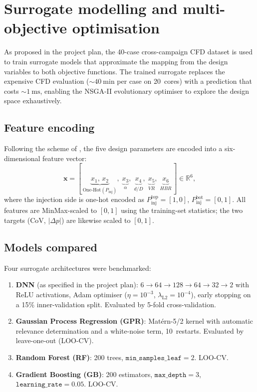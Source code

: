 \documentclass[11pt,a4paper]{article}
\def\VR{VR}%
\def\HBR{HBR}%
\def\CoV{CoV}%
\newcommand{\VR}{\ensuremath{\mathrm{VR}}}
\newcommand{\HBR}{\ensuremath{\mathrm{HBR}}}
\newcommand{\CoV}{\ensuremath{\mathrm{CoV}}}
\begin{document}
\section{Surrogate modelling and multi-objective optimisation}
\label{sec:surrogate}

As proposed in the project plan, the 40-case cross-campaign CFD
dataset is used to train surrogate models that approximate the
mapping from the design variables to both objective functions.
The trained surrogate replaces the expensive CFD evaluation
(\(\sim\SI{40}{\minute}\) per case on 20~cores) with a prediction
that costs \(\sim\SI{1}{\milli\second}\), enabling the NSGA-II
evolutionary optimiser to explore the design space
exhaustively.

\subsection{Feature encoding}
\label{sec:surr_encoding}
Following the scheme of \citet{Su2022}, the five design
parameters are encoded into a six-dimensional feature vector:
\[
   \mathbf{x}
   = [\,\underbrace{x_1,\, x_2}_{\text{One-Hot}(P_{\mathrm{inj}})},\;
      \underbrace{x_3}_{\alpha},\;
      \underbrace{x_4}_{d/D},\;
      \underbrace{x_5}_{\VR},\;
      \underbrace{x_6}_{\HBR}\,]
   \in \mathbb{R}^{6},
\]
where the injection side is one-hot encoded as
\(P_{\mathrm{inj}}^{\text{top}}=[1,0]\),
\(P_{\mathrm{inj}}^{\text{bot}}=[0,1]\).
All features are MinMax-scaled to \([0,1]\) using the training-set
statistics; the two targets (\CoV, \(|\Delta p|\)) are likewise
scaled to \([0,1]\).

\subsection{Models compared}
Four surrogate architectures were benchmarked:
\begin{enumerate}
   \item \textbf{DNN} (as specified in the project plan):
         \(6\!\to\!64\!\to\!128\!\to\!64\!\to\!32\!\to\!2\) with
         ReLU activations, Adam optimiser
         (\(\eta=10^{-3}\), \(\lambda_{\mathrm{L2}}=10^{-4}\)),
         early stopping on a 15\% inner-validation split.
         Evaluated by 5-fold cross-validation.
   \item \textbf{Gaussian Process Regression (GPR)}: Mat\'ern-5/2
         kernel with automatic relevance determination and a white-noise
         term, 10~restarts.  Evaluated by leave-one-out (LOO-CV).
   \item \textbf{Random Forest (RF)}: 200 trees,
         \(\texttt{min\_samples\_leaf}=2\).  LOO-CV.
   \item \textbf{Gradient Boosting (GB)}: 200 estimators,
         \(\texttt{max\_depth}=3\), \(\texttt{learning\_rate}=0.05\).
         LOO-CV.
\end{enumerate}
\end{document}
